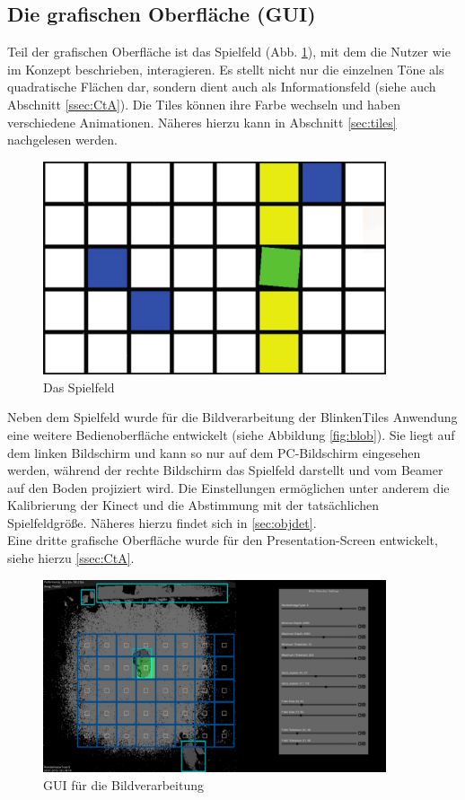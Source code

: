 \subsection{Die grafischen Oberfläche (GUI)}

Teil der grafischen Oberfläche ist das Spielfeld (Abb. \ref{fig:gui-tiles}), mit dem die Nutzer wie im Konzept beschrieben, interagieren. Es stellt nicht nur die einzelnen Töne als quadratische Flächen dar, sondern dient auch als Informationsfeld (siehe auch Abschnitt \ref{ssec:CtA}). Die Tiles können ihre Farbe wechseln und haben verschiedene Animationen. Näheres hierzu kann in Abschnitt \ref{sec:tiles} nachgelesen werden.

\begin{figure}[htbp] 
  \centering
     \includegraphics[width=0.9\textwidth]{images/gui-tiles}
  \caption{Das Spielfeld}
  \label{fig:gui-tiles}
\end{figure}

Neben dem Spielfeld wurde für die Bildverarbeitung der BlinkenTiles Anwendung eine weitere Bedienoberfläche entwickelt (siehe Abbildung \autoref{fig:blob}). Sie liegt auf dem linken Bildschirm und kann so nur auf dem PC-Bildschirm eingesehen werden, während der rechte Bildschirm das Spielfeld darstellt und vom Beamer auf den Boden projiziert wird. Die Einstellungen ermöglichen unter anderem die Kalibrierung der Kinect und die Abstimmung mit der tatsächlichen Spielfeldgröße. Näheres hierzu findet sich in \autoref{sec:objdet}.\\
Eine dritte grafische Oberfläche wurde für den Presentation-Screen entwickelt, siehe hierzu \autoref{ssec:CtA}.

\begin{figure}[htbp] 
  \centering
     \includegraphics[width=0.9\textwidth]{images/Blob}
  \caption{GUI für die Bildverarbeitung}
  \label{fig:blob}
\end{figure}

\newpage